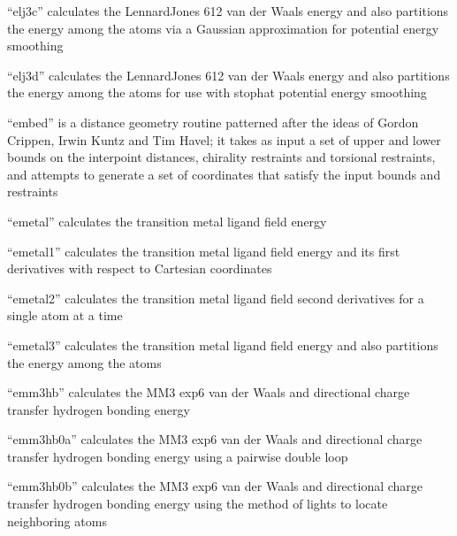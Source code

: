 \documentclass[letterpaper,11pt,english]{sphinxmanual}
\begin{document}

“elj3c” calculates the Lennard\sphinxhyphen{}Jones 6\sphinxhyphen{}12 van der Waals energy and also partitions the energy among the atoms via a Gaussian approximation for potential energy smoothing


“elj3d” calculates the Lennard\sphinxhyphen{}Jones 6\sphinxhyphen{}12 van der Waals energy and also partitions the energy among the atoms for use with stophat potential energy smoothing


“embed” is a distance geometry routine patterned after the ideas of Gordon Crippen, Irwin Kuntz and Tim Havel; it takes as input a set of upper and lower bounds on the interpoint distances, chirality restraints and torsional restraints, and attempts to generate a set of coordinates that satisfy the input bounds and restraints


“emetal” calculates the transition metal ligand field energy


“emetal1” calculates the transition metal ligand field energy and its first derivatives with respect to Cartesian coordinates


“emetal2” calculates the transition metal ligand field second derivatives for a single atom at a time


“emetal3” calculates the transition metal ligand field energy and also partitions the energy among the atoms


“emm3hb” calculates the MM3 exp\sphinxhyphen{}6 van der Waals and directional charge transfer hydrogen bonding energy


“emm3hb0a” calculates the MM3 exp\sphinxhyphen{}6 van der Waals and directional charge transfer hydrogen bonding energy using a pairwise double loop


“emm3hb0b” calculates the MM3 exp\sphinxhyphen{}6 van der Waals and directional charge transfer hydrogen bonding energy using the method of lights to locate neighboring atoms
\end{document}
